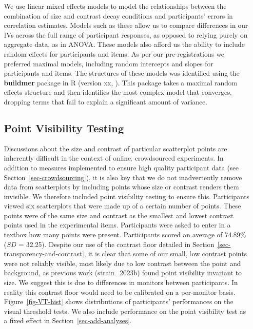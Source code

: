 \documentclass[manuscript, review, anonymous, screen]{acmart}
\begin{document}
We use linear mixed effects models to model the relationships between
the combination of size and contrast decay conditions and participants'
errors in correlation estimates. Models such as these allow us to
compare differences in our IVs across the full range of participant
responses, as opposed to relying purely on aggregate data, as in ANOVA.
These models also afford us the ability to include random effects for
participants and items. As per our pre-registrations we preferred
maximal models, including random intercepts and slopes for participants
and items. The structures of these models was identified using the
\textbf{buildmer} package in R (version xx, \citep{voeten_buildmer}).
This package takes a maximal random effects structure and then
identifies the most complex model that converges, dropping terms that
fail to explain a significant amount of variance.

\hypertarget{sec-VT}{%
\subsection{Point Visibility Testing}\label{sec-VT}}

Discussions about the size and contrast of particular scatterplot points
are inherently difficult in the context of online, crowdsourced
experiments. In addition to measures implemented to ensure high quality
participant data (see Section~\ref{sec-crowdsourcing}), it is also key
that we do not inadvertently remove data from scatterplots by including
points whose size or contrast renders them invisible. We therefore
included point visibility testing to ensure this. Participants viewed
six scatterplots that were made up of a certain number of points. These
points were of the same size and contrast as the smallest and lowest
contrast points used in the experimental items. Participants were asked
to enter in a textbox how many points were present. Participants scored
an average of 74.89\% (\(SD\) = 32.25). Despite our use of the contrast
floor detailed in Section~\ref{sec-transparency-and-contrast}, it is
clear that some of our small, low contrast points were not reliably
visible, most likely due to low contrast between the point and
background, as previous work (strain\_2023b) found point visibility
invariant to size. We suggest this is due to differences in monitors
between participants. In reality this contrast floor would need to be
calibrated on a per-monitor basis. Figure~\ref{fig-VT-hist} shows
distributions of participants' performances on the visual threshold
tests. We also include performance on the point visibility test as a
fixed effect in Section~\ref{sec-add-analyses}.
\end{document}
